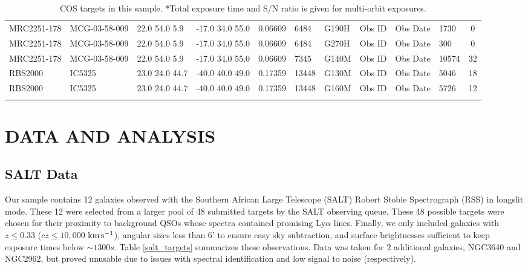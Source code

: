 \documentclass[iop]{emulateapj-rtx4}
\newcommand{\kms}{$\rm km\, s^{-1}$}
\begin{document}
\begin{table}[ht]
\begin{center}
\begin{tabular}{l l l l l l l l l l c}
MRC2251-178  &             MCG-03-58-009  & 22.0  54.0  5.9  &    -17.0  34.0  55.0  &   0.06609  & 6484  &    G190H  &   Obs ID  & Obs Date  & 1730  &       0            \\
MRC2251-178  &             MCG-03-58-009  & 22.0  54.0  5.9  &    -17.0  34.0  55.0  &   0.06609  & 6484  &    G270H  &   Obs ID  & Obs Date  & 300  &        0            \\
MRC2251-178  &             MCG-03-58-009  & 22.0  54.0  5.9  &    -17.0  34.0  55.0  &   0.06609  & 7345  &    G140M  &   Obs ID  & Obs Date  & 10574  &      32           \\
RBS2000  &                 IC5325  &        23.0  24.0  44.7  &   -40.0  40.0  49.0  &   0.17359  & 13448  &   G130M  &   Obs ID  & Obs Date  & 5046  &       18           \\
RBS2000  &                 IC5325  &        23.0  24.0  44.7  &   -40.0  40.0  49.0  &   0.17359  & 13448  &   G160M  &   Obs ID  & Obs Date  & 5726  &       12           \\


 \\
\hline

\end{tabular}
\end{center}
  \caption{\small{COS targets in this sample. *Total exposure time and S/N ratio is given for multi-orbit exposures.}}
  \label{target_table}
\end{table}


\section{DATA AND ANALYSIS}

\subsection{SALT Data}
Our sample contains 12 galaxies observed with the Southern African Large Telescope (SALT) Robert Stobie Spectrograph (RSS) in longslit mode. These 12 were selected from a larger pool of 48 submitted targets by the SALT observing queue. These 48 possible targets were chosen for their proximity to background QSOs whose spectra contained promising Ly$\alpha$ lines. Finally, we only included galaxies with $z \leq 0.33$ ($cz \leq 10,000$ \kms), angular sizes less than 6' to ensure easy sky subtraction, and surface brightnesses sufficient to keep exposure times below $\sim 1300 s$. Table \ref{salt_targets} summarizes these observations. Data was taken for 2 additional galaxies, NGC3640 and NGC2962, but proved unusable due to issues with spectral identification and low signal to noise (respectively).
\end{document}
